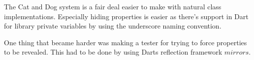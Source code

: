 The Cat and Dog system is a fair deal easier to make with natural
class implementations.  Especially hiding properties is easier as
there's support in Dart for library private variables by using the
underscore naming convention.

One thing that became harder was making a tester for trying to force
properties to be revealed.  This had to be done by using Darts
reflection framework $mirrors$.

